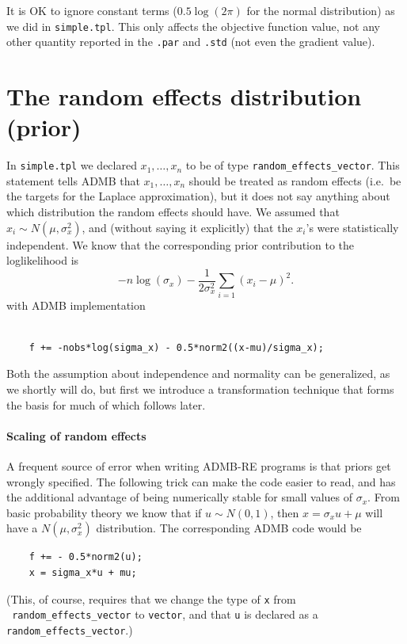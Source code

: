 \documentclass[12pt,letter,reqno]{book}
\begin{document}
It is OK to ignore constant terms ($0.5\log(2\pi)$ for the normal distribution) as we did in \texttt{simple.tpl}.
This only affects the objective function value, not any other quantity reported in the \texttt{.par} and \texttt{.std}
(not even the gradient value).

\section{The random effects distribution (prior)}
In \texttt{simple.tpl} we declared $x_{1},\ldots ,x_{n}$ to be of type \texttt{random\_effects\_vector}. This
statement tells ADMB that $x_{1},\ldots ,x_{n}$ should be treated as random effects (i.e.~be the targets for the
Laplace approximation), but it does not say anything about which distribution the random effects should have. 
We assumed that $x_i\sim N(\mu ,\sigma_{x}^{2})$, and (without saying it explicitly)
that the $x_i$'s were statistically independent. We know that the corresponding prior contribution to the
loglikelihood is
\[
-n\log (\sigma_{x})-\frac{1}{2\sigma_x^2}\sum_{i=1}\left( x_i-\mu \right) ^{2}.
\]
with ADMB implementation
\begin{lstlisting}

    f += -nobs*log(sigma_x) - 0.5*norm2((x-mu)/sigma_x);

\end{lstlisting}
Both the assumption about independence and normality can be generalized, as we shortly will do,
but first we introduce a transformation technique that forms the basis for much of which follows later.

\paragraph{Scaling of random effects}
A frequent source of error when writing ADMB-RE programs is that priors get
wrongly specified. The following trick can make the code easier to read, and
has the additional advantage of being numerically stable for small values of
$\sigma_{x}$. From basic probability theory we know that if $u\sim N(0,1)$,
then $x=\sigma_{x}u+\mu$ will have a $N(\mu ,\sigma_{x}^{2})$ distribution.
The corresponding ADMB code would be
\begin{lstlisting}
    f += - 0.5*norm2(u);
    x = sigma_x*u + mu;
\end{lstlisting}
(This, of course, requires that we change the type of \texttt{x} from \texttt{\ random\_effects\_vector} to
\texttt{vector}, and that \texttt{u} is declared as a \texttt{random\_effects\_vector}.) 
\end{document}
